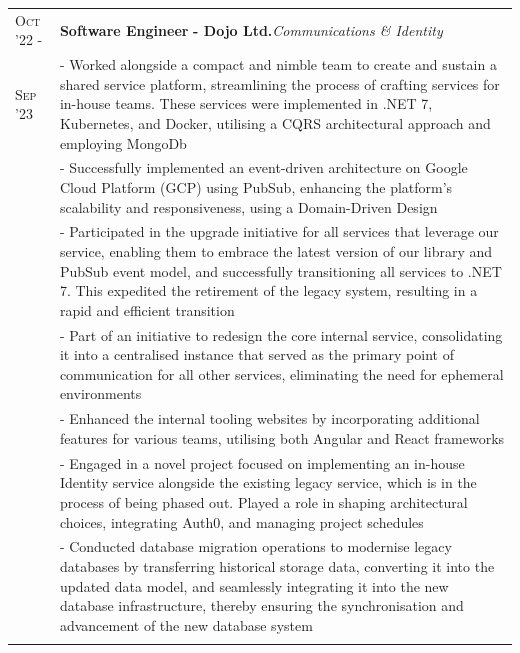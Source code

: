 \documentclass[a4paper,10pt]{extarticle} %
\begin{document}
{\begin{tabularx}{\linewidth}{ l | X }
\textsc{Oct '22 -} & \textbf{Software Engineer} \textbf{ - Dojo Ltd.}\hfill\textit{Communications \& Identity}\\
\textsc{Sep '23} & {- Worked alongside a compact and nimble team to create and sustain a shared service platform, streamlining the process of crafting services for in-house teams. These services were implemented in .NET 7, Kubernetes, and Docker, utilising a CQRS architectural approach and employing MongoDb}\\
& {- Successfully implemented an event-driven architecture on Google Cloud Platform (GCP) using PubSub, enhancing the platform's scalability and responsiveness, using a Domain-Driven Design}\\
& {- Participated in the upgrade initiative for all services that leverage our service, enabling them to embrace the latest version of our library and PubSub event model, and successfully transitioning all services to .NET 7. This expedited the retirement of the legacy system, resulting in a rapid and efficient transition}\\
& {- Part of an initiative to redesign the core internal service, consolidating it into a centralised instance that served as the primary point of communication for all other services, eliminating the need for ephemeral environments}\\
& {- Enhanced the internal tooling websites by incorporating additional features for various teams, utilising both Angular and React frameworks}\\
& {- Engaged in a novel project focused on implementing an in-house Identity service alongside the existing legacy service, which is in the process of being phased out. Played a role in shaping architectural choices, integrating Auth0, and managing project schedules}\\
& {- Conducted database migration operations to modernise legacy databases by transferring historical storage data, converting it into the updated data model, and seamlessly integrating it into the new database infrastructure, thereby ensuring the synchronisation and advancement of the new database system} \\
\multicolumn{1}{c}{} \\


\end{tabularx}}
\end{document}
